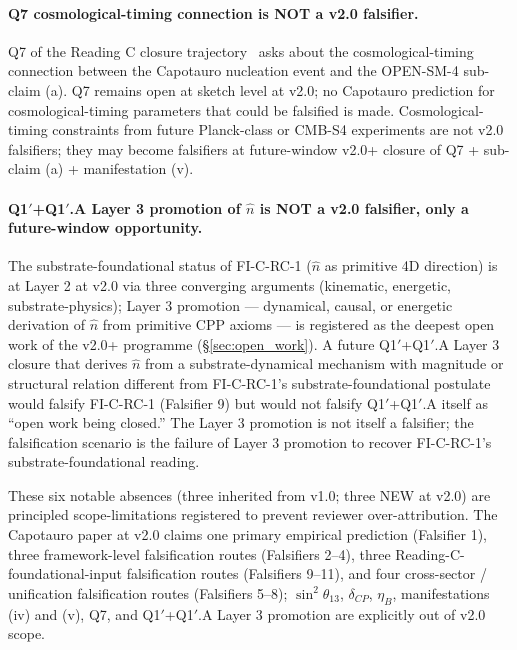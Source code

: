 \documentclass[11pt,letterpaper]{article}
\begin{document}
\paragraph{Q7 cosmological-timing connection is NOT a v2.0 falsifier.}
Q7 of the Reading C closure trajectory~\cite{abshier_capotauro_chiral_mechanism_sketch} asks about the cosmological-timing connection between the Capotauro nucleation event and the OPEN-SM-4 sub-claim (a). Q7 remains open at sketch level at v2.0; no Capotauro prediction for cosmological-timing parameters that could be falsified is made. Cosmological-timing constraints from future Planck-class or CMB-S4 experiments are not v2.0 falsifiers; they may become falsifiers at future-window v2.0+ closure of Q7 + sub-claim (a) + manifestation (v).

\paragraph{Q1$'$+Q1$'$.A Layer 3 promotion of $\hat{n}$ is NOT a v2.0 falsifier, only a future-window opportunity.}
The substrate-foundational status of FI-C-RC-1 ($\hat{n}$ as primitive 4D direction) is at Layer 2 at v2.0 via three converging arguments (kinematic, energetic, substrate-physics); Layer 3 promotion --- dynamical, causal, or energetic derivation of $\hat{n}$ from primitive CPP axioms --- is registered as the deepest open work of the v2.0+ programme (\S\ref{sec:open_work}). A future Q1$'$+Q1$'$.A Layer 3 closure that derives $\hat{n}$ from a substrate-dynamical mechanism with magnitude or structural relation different from FI-C-RC-1's substrate-foundational postulate would falsify FI-C-RC-1 (Falsifier 9) but would not falsify Q1$'$+Q1$'$.A itself as ``open work being closed.'' The Layer 3 promotion is not itself a falsifier; the falsification scenario is the failure of Layer 3 promotion to recover FI-C-RC-1's substrate-foundational reading.

These six notable absences (three inherited from v1.0; three NEW at v2.0) are principled scope-limitations registered to prevent reviewer over-attribution. The Capotauro paper at v2.0 claims one primary empirical prediction (Falsifier 1), three framework-level falsification routes (Falsifiers 2--4), three Reading-C-foundational-input falsification routes (Falsifiers 9--11), and four cross-sector / unification falsification routes (Falsifiers 5--8); $\sin^2\theta_{13}$, $\delta_{CP}$, $\eta_B$, manifestations (iv) and (v), Q7, and Q1$'$+Q1$'$.A Layer 3 promotion are explicitly out of v2.0 scope.
\end{document}

